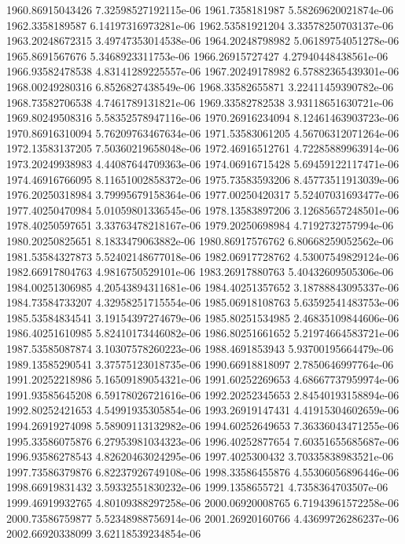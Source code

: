 {1960.86915043426 7.32598527192115e-06
1961.7358181987 5.58269620021874e-06
1962.3358189587 6.14197316973281e-06
1962.53581921204 3.33578250703137e-06
1963.20248672315 3.49747353014538e-06
1964.20248798982 5.06189754051278e-06
1965.8691567676 5.3468923311753e-06
1966.26915727427 4.27940448438561e-06
1966.93582478538 4.83141289225557e-06
1967.20249178982 6.57882365439301e-06
1968.00249280316 6.8526827438549e-06
1968.33582655871 3.22411459390782e-06
1968.73582706538 4.7461789131821e-06
1969.33582782538 3.93118651630721e-06
1969.80249508316 5.58352578947116e-06
1970.26916234094 8.12461463903723e-06
1970.86916310094 5.76209763467634e-06
1971.53583061205 4.56706312071264e-06
1972.13583137205 7.50360219658048e-06
1972.46916512761 4.72285889963914e-06
1973.20249938983 4.44087644709363e-06
1974.06916715428 5.69459122117471e-06
1974.46916766095 8.11651002858372e-06
1975.73583593206 8.45773511913039e-06
1976.20250318984 3.79995679158364e-06
1977.00250420317 5.52407031693477e-06
1977.40250470984 5.01059801336545e-06
1978.13583897206 3.12685657248501e-06
1978.40250597651 3.33763478218167e-06
1979.20250698984 4.7192732757994e-06
1980.20250825651 8.1833479063882e-06
1980.86917576762 6.80668259052562e-06
1981.53584327873 5.52402148677018e-06
1982.06917728762 4.53007549829124e-06
1982.66917804763 4.9816750529101e-06
1983.26917880763 5.40432609505306e-06
1984.00251306985 4.20543894311681e-06
1984.40251357652 3.18788843095337e-06
1984.73584733207 4.32958251715554e-06
1985.06918108763 5.63592541483753e-06
1985.53584834541 3.19154397274679e-06
1985.80251534985 2.46835109844606e-06
1986.40251610985 5.82410173446082e-06
1986.80251661652 5.21974664583721e-06
1987.53585087874 3.10307578260223e-06
1988.4691853943 5.93700195664479e-06
1989.13585290541 3.37575123018735e-06
1990.66918818097 2.7850646997764e-06
1991.20252218986 5.16509189054321e-06
1991.60252269653 4.68667737959974e-06
1991.93585645208 6.59178026721616e-06
1992.20252345653 2.84540193158894e-06
1992.80252421653 4.54991935305854e-06
1993.26919147431 4.41915304602659e-06
1994.26919274098 5.58909113132982e-06
1994.60252649653 7.36336043471255e-06
1995.33586075876 6.27953981034323e-06
1996.40252877654 7.60351655685687e-06
1996.93586278543 4.82620463024295e-06
1997.4025300432 3.70335838983521e-06
1997.73586379876 6.82237926749108e-06
1998.33586455876 4.55306056896446e-06
1998.66919831432 3.59332551830232e-06
1999.1358655721 4.7358364703507e-06
1999.46919932765 4.80109388297258e-06
2000.06920008765 6.71943961572258e-06
2000.73586759877 5.52348988756914e-06
2001.26920160766 4.43699726286237e-06
2002.66920338099 3.62118539234854e-06
}

